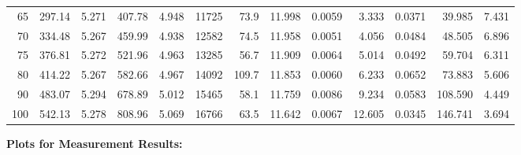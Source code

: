 \documentclass[10pt]{article}
\begin{document}
{\begin{tabular}{|r|rr|rr|rr|rr|rr|r|r|}
       65 &       297.14 &        5.271 &       407.78 &        4.948 &        11725 &         73.9 &       11.998 &       0.0059 &        3.333 &       0.0371 &       39.985 &        7.431 \\
       70 &       334.48 &        5.267 &       459.99 &        4.938 &        12582 &         74.5 &       11.958 &       0.0051 &        4.056 &       0.0484 &       48.505 &        6.896 \\
       75 &       376.81 &        5.272 &       521.96 &        4.963 &        13285 &         56.7 &       11.909 &       0.0064 &        5.014 &       0.0492 &       59.704 &        6.311 \\
       80 &       414.22 &        5.267 &       582.66 &        4.967 &        14092 &        109.7 &       11.853 &       0.0060 &        6.233 &       0.0652 &       73.883 &        5.606 \\
       90 &       483.07 &        5.294 &       678.89 &        5.012 &        15465 &         58.1 &       11.759 &       0.0086 &        9.234 &       0.0583 &      108.590 &        4.449 \\
      100 &       542.13 &        5.278 &       808.96 &        5.069 &        16766 &         63.5 &       11.642 &       0.0067 &       12.605 &       0.0345 &      146.741 &        3.694 \\
\hline
\end{tabular}
}

\vspace{3mm}






\pagebreak
\noindent
{\large \bf Plots for Measurement Results:}
\vspace{5mm}
\end{document}
